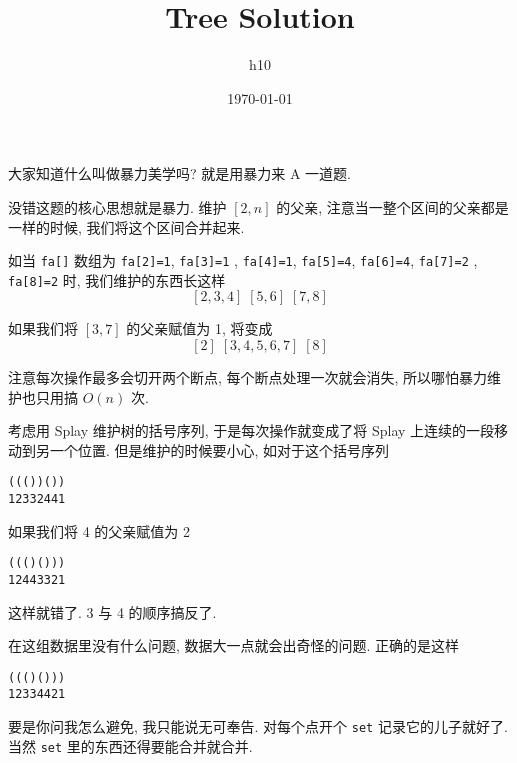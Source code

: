 \documentclass[12pt,a4paper]{article}
\author{h10}
\date{\today}
\title{Tree Solution}
\begin{document}
\maketitle

大家知道什么叫做暴力美学吗?
就是用暴力来 A 一道题.

没错这题的核心思想就是暴力.
维护 $[2, n]$ 的父亲, 注意当一整个区间的父亲都是一样的时候, 我们将这个区间合并起来.

如当 \texttt{fa[]} 数组为 \texttt{fa[2]=1}, \texttt{fa[3]=1} , \texttt{fa[4]=1}, \texttt{fa[5]=4}, \texttt{fa[6]=4}, \texttt{fa[7]=2} , \texttt{fa[8]=2} 时, 我们维护的东西长这样
$$[2,3,4]\;[5,6]\;[7,8]$$

如果我们将 $[3,7]$ 的父亲赋值为 1, 将变成 
$$[2]\;[3,4,5,6,7]\;[8]$$

注意每次操作最多会切开两个断点, 每个断点处理一次就会消失, 所以哪怕暴力维护也只用搞 $O(n)$ 次.

考虑用 Splay 维护树的括号序列, 于是每次操作就变成了将 Splay 上连续的一段移动到另一个位置.
但是维护的时候要小心, 如对于这个括号序列 
\begin{verbatim}
((())()) 
12332441
\end{verbatim}

如果我们将 4 的父亲赋值为 2 
\begin{verbatim}
((()())) 
12443321
\end{verbatim}

这样就错了.
3 与 4 的顺序搞反了.

在这组数据里没有什么问题, 数据大一点就会出奇怪的问题.
正确的是这样
\begin{verbatim}
((()())) 
12334421
\end{verbatim}

要是你问我怎么避免, 我只能说无可奉告.
对每个点开个 \texttt{set} 记录它的儿子就好了.
当然 \texttt{set} 里的东西还得要能合并就合并.
\end{document}
